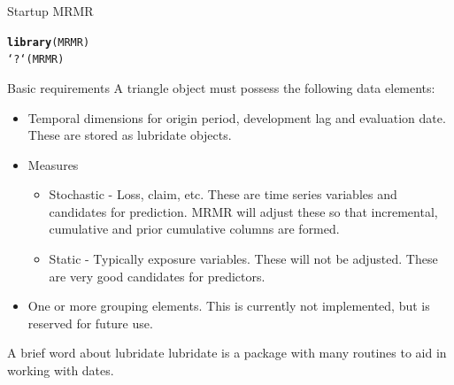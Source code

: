 \documentclass[xcolor=dvipsnames]{beamer}\usepackage{graphicx, color}
\makeatletter
\newcommand{\hlfunctioncall}[1]{\textcolor[rgb]{0.501960784313725,0,0.329411764705882}{\textbf{#1}}}%
\newenvironment{kframe}{%
 \def\at@end@of@kframe{}%
 \ifinner\ifhmode%
  \def\at@end@of@kframe{\end{minipage}}%
  \begin{minipage}{\columnwidth}%
 \fi\fi%
 \def\FrameCommand##1{\hskip\@totalleftmargin \hskip-\fboxsep
 \colorbox{shadecolor}{##1}\hskip-\fboxsep
     \hskip-\linewidth \hskip-\@totalleftmargin \hskip\columnwidth}%
 \MakeFramed {\advance\hsize-\width
   \@totalleftmargin\z@ \linewidth\hsize
   \@setminipage}}%
 {\par\unskip\endMakeFramed%
 \at@end@of@kframe}
\newenvironment{knitrout}{}{} %
\makeatother
\begin{document}
\begin{frame}[fragile]{Startup MRMR}
\begin{knitrout}
\color{fgcolor}\begin{kframe}
\begin{alltt}
\hlfunctioncall{library}(MRMR)
`?`(MRMR)
\end{alltt}
\end{kframe}
\end{knitrout}




\end{frame}

\begin{frame}{Basic requirements}
  A triangle object must possess the following data elements:
  \begin{itemize}
    \item Temporal dimensions for origin period, development lag and evaluation date. These are stored as lubridate objects.
    \item Measures
      \begin{itemize}
        \item Stochastic - Loss, claim, etc. These are time series variables and candidates for prediction. MRMR will adjust these so that incremental, cumulative and prior cumulative columns are formed.
        \item Static - Typically exposure variables. These will not be adjusted. These are very good candidates for predictors.
      \end{itemize}
    \item One or more grouping elements. This is currently not implemented, but is reserved for future use.
  \end{itemize}
\end{frame}

\begin{frame}[fragile]{A brief word about lubridate}
lubridate is a package with many routines to aid in working with dates. 
\end{frame}
\end{document}
